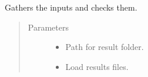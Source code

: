\documentclass[letterpaper,10pt,english]{sphinxmanual}
\begin{document}
\begin{fulllineitems}
\begin{fulllineitems}
\end{fulllineitems}


\begin{fulllineitems}
\label{\detokenize{comfort:livestock.components.air.LoadAirResult.run_checks}}
Gathers the inputs and checks them.
\begin{quote}\begin{description}
\item[{Parameters}] \leavevmode\begin{itemize}
\item {} 
 \textendash{} Path for result folder.

\item {} 
 \textendash{} Load results files.

\end{itemize}

\end{description}\end{quote}

\end{fulllineitems}


\end{fulllineitems}

\end{document}
